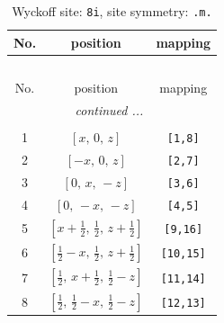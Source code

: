 \documentclass[fleqn,8pt]{jsarticle}
\begin{document}
\begin{longtable}{ccc}
\caption{Wyckoff site: {\tt 8i}, site symmetry: {\tt .m.}}
 \\
 \hline \hline
No. & position & mapping \\ \hline \endfirsthead

\multicolumn{2}{l}{\tablename\ \thetable{}} \\
 \hline \hline
No. & position & mapping \\ \hline \endhead

 \hline \hline
\multicolumn{2}{r}{\footnotesize\it continued ...} \\ \endfoot

 \hline \hline
\multicolumn{2}{r}{} \\ \endlastfoot

1 & $\left[ x,\, 0,\, z \right]$ & {\tt [1,8]} \\ \hline
2 & $\left[ - x,\, 0,\, z \right]$ & {\tt [2,7]} \\ \hline
3 & $\left[ 0,\, x,\, - z \right]$ & {\tt [3,6]} \\ \hline
4 & $\left[ 0,\, - x,\, - z \right]$ & {\tt [4,5]} \\ \hline
5 & $\left[ x + \frac{1}{2},\, \frac{1}{2},\, z + \frac{1}{2} \right]$ & {\tt [9,16]} \\ \hline
6 & $\left[ \frac{1}{2} - x,\, \frac{1}{2},\, z + \frac{1}{2} \right]$ & {\tt [10,15]} \\ \hline
7 & $\left[ \frac{1}{2},\, x + \frac{1}{2},\, \frac{1}{2} - z \right]$ & {\tt [11,14]} \\ \hline
8 & $\left[ \frac{1}{2},\, \frac{1}{2} - x,\, \frac{1}{2} - z \right]$ & {\tt [12,13]} \\
\end{longtable}
\renewcommand{\arraystretch}{1.2}
\end{document}
